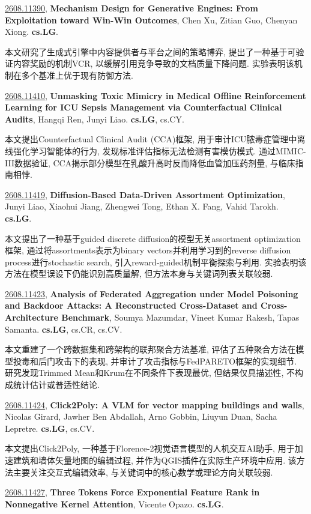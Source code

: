 \documentclass[9pt, a4paper]{article}
\theoremstyle{plain}
\theoremstyle{definition}
\theoremstyle{remark}
\newcommand{\arxivwithtarget}[3]{\hypertarget{#1}{}\href{https://arxiv.org/abs/#1}{#1}, \textbf{\textcolor{arxivblue}{#2}}, #3. }
\begin{document}
\arxivwithtarget{2608.11390}{Mechanism Design for Generative Engines: From Exploitation toward Win-Win Outcomes}{Chen Xu, Zitian Guo, Chenyan Xiong}\textbf{cs.LG}.

本文研究了生成式引擎中内容提供者与平台之间的策略博弈, 提出了一种基于可验证内容奖励的机制VCR, 以缓解引用竞争导致的文档质量下降问题. 实验表明该机制在多个基准上优于现有防御方法.


\arxivwithtarget{2608.11410}{Unmasking Toxic Mimicry in Medical Offline Reinforcement Learning for ICU Sepsis Management via Counterfactual Clinical Audits}{Hangqi Ren, Junyi Liao}\textbf{cs.LG}, cs.CY.

本文提出Counterfactual Clinical Audit (CCA)框架, 用于审计ICU脓毒症管理中离线强化学习智能体的行为, 发现标准评估指标无法检测有害模仿模式. 通过MIMIC-III数据验证, CCA揭示部分模型在乳酸升高时反而降低血管加压药剂量, 与临床指南相悖.


\arxivwithtarget{2608.11419}{Diffusion-Based Data-Driven Assortment Optimization}{Junyi Liao, Xiaohui Jiang, Zhengwei Tong, Ethan X. Fang, Vahid Tarokh}\textbf{cs.LG}.

本文提出了一种基于guided discrete diffusion的模型无关assortment optimization框架, 通过将assortments表示为binary vectors并利用学习到的reverse diffusion process进行stochastic search, 引入reward-guided机制平衡探索与利用. 实验表明该方法在模型误设下仍能识别高质量解, 但方法本身与关键词列表关联较弱.


\arxivwithtarget{2608.11423}{Analysis of Federated Aggregation under Model Poisoning and Backdoor Attacks: A Reconstructed Cross-Dataset and Cross-Architecture Benchmark}{Soumya Mazumdar, Vineet Kumar Rakesh, Tapas Samanta}\textbf{cs.LG}, cs.CR, cs.CV.

本文重建了一个跨数据集和跨架构的联邦聚合方法基准, 评估了五种聚合方法在模型投毒和后门攻击下的表现, 并审计了攻击指标与FedPARETO框架的实现细节. 研究发现Trimmed Mean和Krum在不同条件下表现最优, 但结果仅具描述性, 不构成统计估计或普适性结论.


\arxivwithtarget{2608.11424}{Click2Poly: A VLM for vector mapping buildings and walls}{Nicolas Girard, Jawher Ben Abdallah, Arno Gobbin, Liuyun Duan, Sacha Lepretre}\textbf{cs.LG}, cs.CV.

本文提出Click2Poly, 一种基于Florence-2视觉语言模型的人机交互AI助手, 用于加速建筑和墙体矢量地图的编辑过程, 并作为QGIS插件在实际生产环境中应用. 该方法主要关注交互式编辑效率, 与关键词中的核心数学或理论方向关联较弱.


\arxivwithtarget{2608.11427}{Three Tokens Force Exponential Feature Rank in Nonnegative Kernel Attention}{Vicente Opazo}\textbf{cs.LG}.
\end{document}
